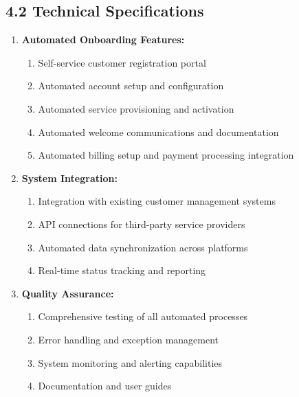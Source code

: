 \subsection*{4.2 Technical Specifications}
\begin{enumerate}[label=\arabic*.]
\item \textbf{Automated Onboarding Features:}
    \begin{enumerate}[label=(\alph*)]
    \item Self-service customer registration portal
    \item Automated account setup and configuration
    \item Automated service provisioning and activation
    \item Automated welcome communications and documentation
    \item Automated billing setup and payment processing integration
    \end{enumerate}

\item \textbf{System Integration:}
    \begin{enumerate}[label=(\alph*)]
    \item Integration with existing customer management systems
    \item API connections for third-party service providers
    \item Automated data synchronization across platforms
    \item Real-time status tracking and reporting
    \end{enumerate}

\item \textbf{Quality Assurance:}
    \begin{enumerate}[label=(\alph*)]
    \item Comprehensive testing of all automated processes
    \item Error handling and exception management
    \item System monitoring and alerting capabilities
    \item Documentation and user guides
    \end{enumerate}
\end{enumerate}

